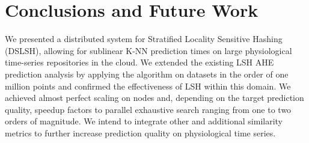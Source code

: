 \documentclass{article}
\begin{document}
\section{Conclusions and Future Work}

We presented a distributed system for Stratified Locality Sensitive Hashing (DSLSH), allowing for sublinear K-NN prediction times on large physiological time-series repositories in the cloud. We extended the existing LSH AHE prediction analysis by applying the algorithm on datasets in the order of one million points and confirmed the effectiveness of LSH within this domain. We achieved almost perfect scaling on nodes and, depending on the target prediction quality, speedup factors to parallel exhaustive search ranging from one to two orders of magnitude. %
We intend to integrate other and additional similarity metrics to further increase prediction quality on physiological time series.


\end{document}
